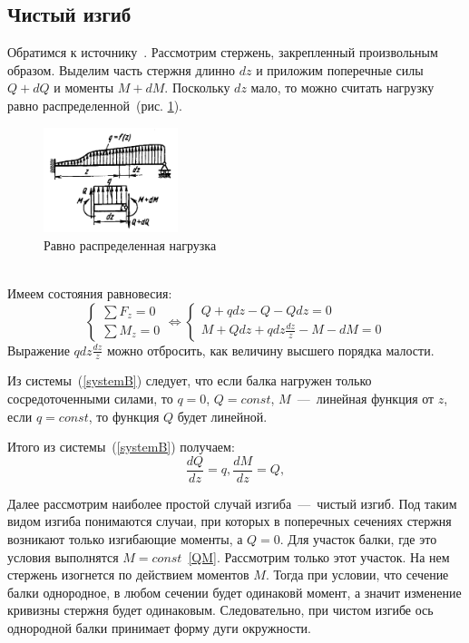 \documentclass[12pt, a4paper]{article}
\begin{document}
\subsection{Чистый изгиб}
Обратимся к источнику~\cite{Feofociev}.
Рассмотрим стержень, закрепленный произвольным образом. Выделим часть стержня длинно $dz$ и приложим поперечные силы $Q + dQ$ и моменты $M + dM$. Поскольку $dz$ мало, то можно считать нагрузку равно распределенной~(рис. \ref{pic1}).
\begin{figure}[!h]
	\centering
	\includegraphics[width=0.35\textwidth]{pic.1}%
	\caption{Равно распределенная нагрузка}
	\vspace*{-2mm}
	\label{pic1}
\end{figure}
\\Имеем состояния равновесия:  
\begin{equation}
	\label{systemB}
	\begin{cases}
	\sum\limits {{F_z = 0}} \\
	\sum\limits {{M_z = 0}}
	\end{cases}
	\Leftrightarrow
	\begin{cases}
		Q + q dz - Q - Q dz = 0 \\
		M + Q dz + q dz \frac {dz}{z} - M -dM = 0
	\end{cases}
\end{equation}
Выражение $q dz \frac {dz}{z}$ можно отбросить,
как величину высшего порядка малости.

Из системы~(\ref{systemB}) следует, что если балка нагружен только сосредоточенными силами, то $q = 0$, $Q = const$, $M$~---~линейная функция от $z$, если $q = const$, то функция $Q$ будет линейной.

Итого из системы~(\ref{systemB}) получаем:
\begin{equation}
	\label{QM}
 \frac {dQ}{dz} = q, 
 \frac {dM}{dz} = Q,
\end{equation}

Далее рассмотрим наиболее простой случай изгиба~---~чистый изгиб. Под таким видом изгиба понимаются случаи, при которых в поперечных сечениях стержня возникают только изгибающие моменты, а $Q = 0$. Для участок балки, где это условия выполнятся $M = const$~\eqref{QM}. Рассмотрим только этот участок. На нем стержень изогнется по действием моментов $M$. Тогда при условии, что сечение балки однородное, в любом сечении будет одинаковй момент, а значит изменение кривизны стержня будет одинаковым. Следовательно, при чистом изгибе ось однородной балки принимает форму дуги окружности.
\end{document}
